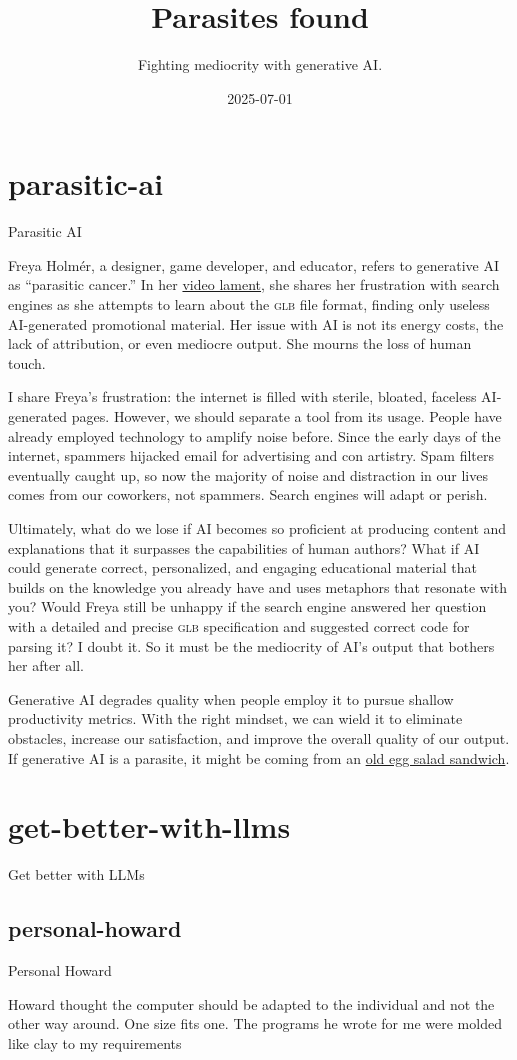 \documentclass{article}
\title{Parasites found}
\subtitle{Fighting mediocrity with generative AI.}
\date{2025-07-01}
\begin{document}
\section{parasitic-ai}{Parasitic AI}

Freya Holmér, a designer, game developer, and educator, refers to generative AI as ``parasitic cancer.''
In her \href{https://youtu.be/-opBifFfsMY?si=5SZIgOB76GTq0hBu}{video lament},
she shares her frustration with search engines as she attempts to learn about the \textsc{glb} file format,
finding only useless AI-generated promotional material.
Her issue with AI is not its energy costs, the lack of attribution, or even mediocre output.
She mourns the loss of human touch.

I share Freya’s frustration: the internet is filled with sterile, bloated, faceless AI-generated pages.
However, we should separate a tool from its usage.
People have already employed technology to amplify noise before.
Since the early days of the internet, spammers hijacked email for advertising and con artistry.
Spam filters eventually caught up, so now the majority of noise and distraction in our lives comes from our coworkers, not spammers.
Search engines will adapt or perish.

Ultimately, what do we lose if AI becomes so proficient at producing content and explanations that it surpasses the capabilities of human authors?
What if AI could generate correct, personalized, and engaging educational material that builds on the knowledge you already have and uses metaphors that resonate with you?
Would Freya still be unhappy if the search engine answered her question with a detailed and precise \textsc{glb} specification and suggested correct code for parsing it?
I doubt it.
So it must be the mediocrity of AI's output that bothers her after all.

Generative AI degrades quality when people employ it to pursue shallow productivity metrics.
With the right mindset, we can wield it to eliminate obstacles, increase our satisfaction, and improve the overall quality of our output.
If generative AI is a parasite, it might be coming from an \href{https://en.wikipedia.org/wiki/Parasites_Lost}{old egg salad sandwich}.

\section{get-better-with-llms}{Get better with LLMs}
\subsection{personal-howard}{Personal Howard}
\epigraph{
  Howard thought the computer should be adapted to the individual and not the other way around.
  One size fits one.
  The programs he wrote for me were molded like clay to my requirements
}{}
\end{document}

